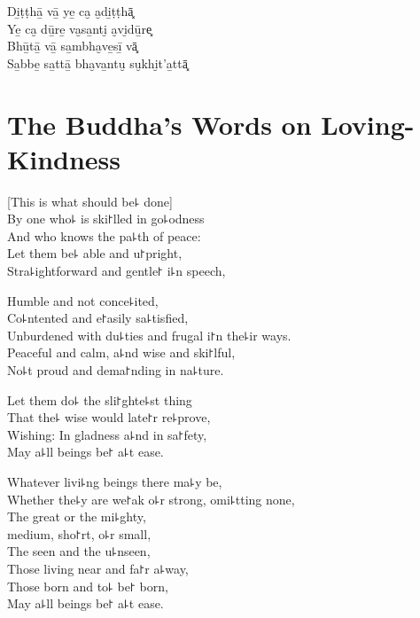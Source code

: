 Di̱ṭṭhā̱ vā̱ ye̱ ca̮ a̮di̱ṭṭhā͓\\
Ye̱ ca̮ dū̱re̱ va̮sa̱nti̮ a̮vi̮dū̱re͓\\
Bhū̱tā̱ vā̱ sa̱mbha̮ve̱sī̱ vā͓\\
Sa̱bbe̱ sa̱ttā̱ bha̮va̱ntu̮ su̮khi̮t'a̱ttā͓

\chapter[Loving-Kindness]{The Buddha's Words on Loving-Kindness}


\begin{leader}
\end{leader}

[This is what should be꜕ done]\\
By one who꜕ is ski꜓lled in go꜕odness\\
And who knows the pa꜕th of peace:\\
Let them be꜕ able and u꜓pright,\\
Stra꜕ightforward and gentle꜓ i꜕n speech,

Humble and not conce꜕ited,\\
Co꜕ntented and e꜓asily sa꜕tisfied,\\
Unburdened with du꜕ties and frugal i꜓n the꜕ir ways.\\
Peaceful and calm, a꜕nd wise and ski꜓lful,\\
No꜕t proud and dema꜓nding in na꜕ture.

Let them  do꜕ the sli꜓ghte꜕st thing\\
That the꜕ wise would late꜓r re꜕prove,\\
Wishing: In gladness a꜕nd in sa꜓fety,\\
May a꜕ll beings be꜓ a꜕t ease.

Whatever livi꜕ng beings there ma꜕y be,\\
Whether the꜕y are we꜓ak o꜕r strong, omi꜕tting none,\\
The great or the mi꜕ghty,\\
\vin medium, sho꜓rt, o꜕r small,\\
The seen and the u꜕nseen,\\
Those living near and fa꜓r a꜕way,\\
Those born and to꜕ be꜓ born,\\
May a꜕ll beings be꜓ a꜕t ease.

\clearpage

